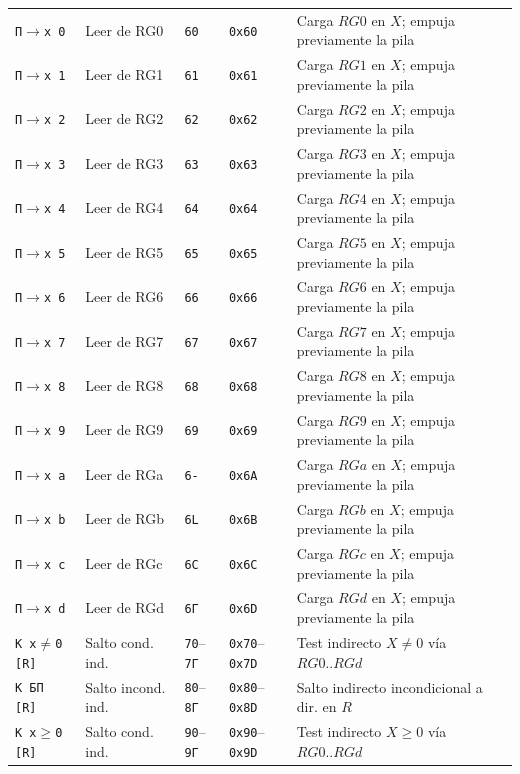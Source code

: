 \documentclass[11pt,a4paper]{article}
\begin{document}
{\begin{longtable}{p{2.2cm}p{3.0cm}>{\centering\arraybackslash}p{1.0cm}>{\centering\arraybackslash}p{1.2cm}p{7.3cm}}
\midrule
\texttt{П$\to$x 0} & Leer de RG0 & \texttt{60} & \texttt{0x60} & Carga $RG0$ en $X$; empuja previamente la pila \\
\texttt{П$\to$x 1} & Leer de RG1 & \texttt{61} & \texttt{0x61} & Carga $RG1$ en $X$; empuja previamente la pila \\
\texttt{П$\to$x 2} & Leer de RG2 & \texttt{62} & \texttt{0x62} & Carga $RG2$ en $X$; empuja previamente la pila \\
\texttt{П$\to$x 3} & Leer de RG3 & \texttt{63} & \texttt{0x63} & Carga $RG3$ en $X$; empuja previamente la pila \\
\texttt{П$\to$x 4} & Leer de RG4 & \texttt{64} & \texttt{0x64} & Carga $RG4$ en $X$; empuja previamente la pila \\
\texttt{П$\to$x 5} & Leer de RG5 & \texttt{65} & \texttt{0x65} & Carga $RG5$ en $X$; empuja previamente la pila \\
\texttt{П$\to$x 6} & Leer de RG6 & \texttt{66} & \texttt{0x66} & Carga $RG6$ en $X$; empuja previamente la pila \\
\texttt{П$\to$x 7} & Leer de RG7 & \texttt{67} & \texttt{0x67} & Carga $RG7$ en $X$; empuja previamente la pila \\
\texttt{П$\to$x 8} & Leer de RG8 & \texttt{68} & \texttt{0x68} & Carga $RG8$ en $X$; empuja previamente la pila \\
\texttt{П$\to$x 9} & Leer de RG9 & \texttt{69} & \texttt{0x69} & Carga $RG9$ en $X$; empuja previamente la pila \\
\texttt{П$\to$x a} & Leer de RGa & \texttt{6-} & \texttt{0x6A} & Carga $RGa$ en $X$; empuja previamente la pila \\
\texttt{П$\to$x b} & Leer de RGb & \texttt{6L} & \texttt{0x6B} & Carga $RGb$ en $X$; empuja previamente la pila \\
\texttt{П$\to$x c} & Leer de RGc & \texttt{6C} & \texttt{0x6C} & Carga $RGc$ en $X$; empuja previamente la pila \\
\texttt{П$\to$x d} & Leer de RGd & \texttt{6Г} & \texttt{0x6D} & Carga $RGd$ en $X$; empuja previamente la pila \\
\midrule
\texttt{K x$\ne$0 [R]} & Salto cond. ind. & \texttt{70}--\texttt{7Г} & \texttt{0x70}--\texttt{0x7D} & Test indirecto $X \ne 0$ vía $RG0..RGd$ \\
\texttt{K БП [R]} & Salto incond. ind. & \texttt{80}--\texttt{8Г} & \texttt{0x80}--\texttt{0x8D} & Salto indirecto incondicional a dir. en $R$ \\
\texttt{K x$\ge$0 [R]} & Salto cond. ind. & \texttt{90}--\texttt{9Г} & \texttt{0x90}--\texttt{0x9D} & Test indirecto $X \ge 0$ vía $RG0..RGd$ \\

\end{longtable}}
\end{document}
